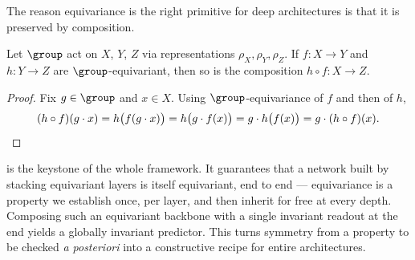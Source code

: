 The reason equivariance is the right primitive for deep architectures is that it
is preserved by composition.

\begin{theorem}
\label{thm:priors:composition}
Let $\group$ act on $X$, $Y$, $Z$ via representations $\rho_X, \rho_Y, \rho_Z$.
If $f \colon X \to Y$ and $h \colon Y \to Z$ are $\group$-equivariant, then so
is the composition $h \circ f \colon X \to Z$.
\end{theorem}

\begin{proof}
Fix $g \in \group$ and $x \in X$. Using $\group$-equivariance of $f$ and then of
$h$,
\[
  (h \circ f)(g \cdot x) = h\bigl(f(g \cdot x)\bigr)
    = h\bigl(g \cdot f(x)\bigr)
    = g \cdot h\bigl(f(x)\bigr)
    = g \cdot (h \circ f)(x). \qedhere
\]
\end{proof}

 is the keystone of the whole framework. It
guarantees that a network built by stacking equivariant layers is itself
equivariant, end to end --- equivariance is a property we establish once, per
layer, and then inherit for free at every depth. Composing such an equivariant
backbone with a single invariant readout at the end yields a globally invariant
predictor. This turns symmetry from a property to be checked \emph{a posteriori}
into a constructive recipe for entire architectures.

